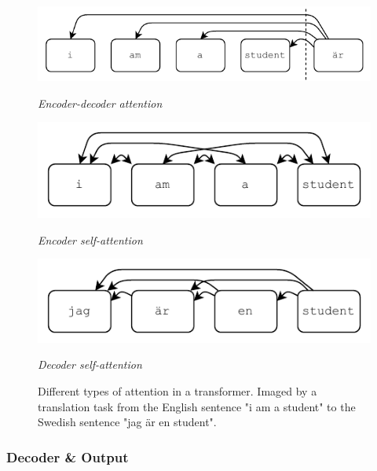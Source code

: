 \begin{figure}[h]
    \centering
    \begin{minipage}{\textwidth}
        \centering
        \includegraphics[width=0.6\linewidth]{Figures/figs-enc-dec-att.pdf}\par
        \emph{Encoder-decoder attention}
    \end{minipage}\vspace{1em}
    \begin{minipage}{0.49\textwidth}
        \centering
        \includegraphics[width=\linewidth]{Figures/figs-enc-self-att.pdf}\par
        \emph{Encoder self-attention}
    \end{minipage}
    \begin{minipage}{0.49\textwidth}
        \centering
        \vspace{4px}
        \includegraphics[width=\linewidth]{Figures/figs-dec-self-att.pdf}\par
        \emph{Decoder self-attention}
    \end{minipage}\vspace{1em}
    \caption{Different types of attention in a transformer. Imaged by a translation task from the English sentence "i am a student" to the Swedish sentence "jag är en student". }
    \label{fig:selfatts}
\end{figure}

\subsubsection{Decoder \& Output}

